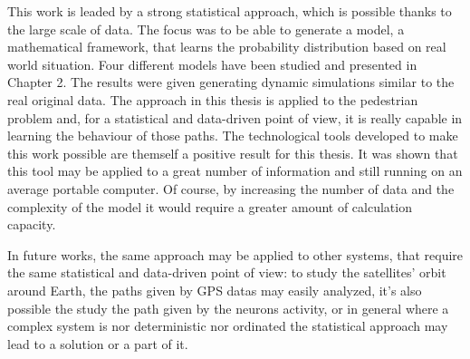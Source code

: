 \documentclass[class=article, crop=false]{standalone}
\begin{document}

This work is leaded by a strong statistical approach, which is possible thanks to the large scale of data.
The focus was to be able to generate a model, a mathematical framework, that learns the probability distribution based on real world situation.
Four different models have been studied and presented in Chapter 2.
The results were given generating dynamic simulations similar to the real original data.
The approach in this thesis is applied to the pedestrian problem and, for a statistical and data-driven point of view, it is really capable in learning the behaviour of those paths.
The technological tools developed to make this work possible are themself a positive result for this thesis.
It was shown that this tool may be applied to a great number of information and still running on an average portable computer.
Of course, by increasing the number of data and the complexity of the model it would require a greater amount of calculation capacity.

In future works, the same approach may be applied to other systems, that require the same statistical and data-driven point of view: 
to study the satellites' orbit around Earth, the paths given by GPS datas may easily analyzed, it's also possible the study the path given by the neurons activity, 
or in general where a complex system is nor deterministic nor ordinated the statistical approach may lead to a solution or a part of it.
\end{document}

